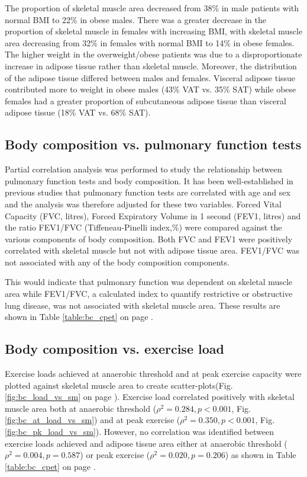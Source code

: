 The proportion of skeletal muscle area decreased from 38\% in male patients with normal BMI to 22\% in obese males. 
There was a greater decrease in the proportion of skeletal muscle in females with increasing BMI, with skeletal muscle area decreasing from 32\% in females with normal BMI to 14\% in obese females. 
The higher weight in the overweight/obese patients was due to a disproportionate increase in adipose tissue rather than skeletal muscle. 
Moreover, the distribution of the adipose tissue differed between males and females.
Visceral adipose tissue contributed more to weight in obese males (43\% VAT vs. 35\% SAT) while obese females had a greater proportion of subcutaneous adipose tissue than visceral adipose tissue (18\% VAT vs. 68\% SAT).

\clearpage

\subsection{Body composition vs. pulmonary function tests}

Partial correlation analysis was performed to study the relationship between pulmonary function tests and body composition. 
It has been well-established in previous studies that pulmonary function tests are correlated with age and sex and the analysis was therefore adjusted for these two variables. 
Forced Vital Capacity (FVC, litres), Forced Expiratory Volume in 1 second (FEV1, litres) and the ratio FEV1/FVC (Tiffeneau-Pinelli index,\%) were compared against the various components of body composition. 
Both FVC and FEV1 were positively correlated with skeletal muscle but not with adipose tissue area. 
FEV1/FVC was not associated with any of the body composition components. 

This would indicate that pulmonary function was dependent on skeletal muscle area while FEV1/FVC, a calculated index to quantify restrictive or obstructive lung disease, was not associated with skeletal muscle area. 
These results are shown in Table \ref{table:bc_cpet} on page \pageref{table:bc_cpet}.

\subsection{Body composition vs. exercise load}

Exercise loads achieved at anaerobic threshold and at peak exercise capacity were plotted against skeletal muscle area to create scatter-plots(Fig. \ref{fig:bc_load_vs_sm} on page \pageref{fig:bc_load_vs_sm}).  
Exercise load correlated positively with skeletal muscle area both at anaerobic threshold ($\rho^2 = 0.284, p < 0.001$, Fig. \ref{fig:bc_at_load_vs_sm}) and at peak exercise ($\rho^2 = 0.350, p < 0.001$, Fig. \ref{fig:bc_pk_load_vs_sm}). 
However, no correlation was identified between exercise loads achieved and adipose tissue area either at anaerobic threshold ($\rho^2 = 0.004, p = 0.587$) or peak exercise ($\rho^2 = 0.020, p = 0.206$) as shown in Table \ref{table:bc_cpet} on page \pageref{table:bc_cpet}.

